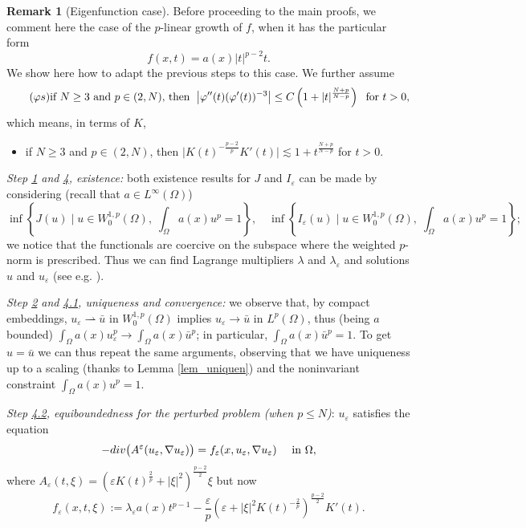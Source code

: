 \documentclass[11pt, reqno]{amsart}
\theoremstyle{definition}
\newtheorem{remark}[lemma]{Remark}
\numberwithin{equation}{section}
\newcommand{\dive}{{\rm div}}
\def\eps{\varepsilon}
\newcommand{\wto}{\rightharpoonup}
\begin{document}
\begin{remark}[Eigenfunction case]
\label{rem_weighted_eigenfunctions}
Before proceeding to the main proofs, we comment here the case of the $p$-linear growth of $f$, when it has the particular form 
$$f(x,t) = a(x) |t|^{p-2} t.$$
We show here how to adapt the previous steps to this case. 
We further assume
\begin{equation}\label{eq_ipot_aggiunt_phi_eigenf}
\tag{$\varphi s$}
\hbox{if $N\geq 3$ and $p \in (2, N)$, then } \; \big|\varphi''(t) (\varphi'(t))^{-3}\big|\leq C\left(1+|t|^{\frac{N+p}{N-p}}\right) \; \hbox{ for $t>0$,}
\end{equation}
which means, in terms of $K$,
\begin{itemize}
\item if $N\geq 3$ and $p \in (2,N)$, then $\big|K(t)^{-\frac{p-2}{p}} K'(t)\big| \lesssim 1+ t^{\frac{N+p}{N-p}}$ for $t > 0$.
\end{itemize}

\smallskip

\emph{Step \hyperlink{Step1}{1} and \hyperlink{Step4}{4}, existence:} 
both existence results for $J$ and $I_{\eps}$ can be made by considering (recall that $a \in L^{\infty}(\Omega)$)
$$\inf\left\{ J(u) \mid u \in W^{1,p}_0(\Omega), \; \int_{\Omega} a(x) u^p = 1 \right\}, \quad \inf\left\{ I_{\eps}(u) \mid u \in W^{1,p}_0(\Omega), \; \int_{\Omega} a(x) u^p = 1 \right\};$$
we notice that the functionals are coercive on the subspace where the weighted $p$-norm is prescribed. 
Thus we can find Lagrange multipliers $\lambda$ and $\lambda_{\eps}$ and solutions $u$ and $u_{\eps}$ (see e.g. \cite[Theorem 6.3.2]{Ber77}). 

\smallskip

\emph{Step \hyperlink{Step2}{2} and \hyperlink{Step4.1}{4.1}, uniqueness and convergence:} 
we observe that, by compact embeddings, $u_{\eps} \wto \bar{u}$ in $W^{1,p}_0(\Omega)$ implies $u_{\eps} \to \bar{u}$ in $L^p(\Omega)$, thus (being $a$ bounded) $\int_{\Omega} a(x) u_{\eps}^p\to \int_{\Omega} a(x) \bar{u}^p$; in particular, $\int_{\Omega} a(x) \bar{u}^p = 1$. 
To get $u=\bar{u}$ we can thus repeat the same arguments, observing that we have uniqueness up to a scaling (thanks to Lemma \ref{lem_uniquen}) and the noninvariant constraint $\int_{\Omega} a(x) u^p = 1 $.

\smallskip

\emph{Step \hyperlink{Step4.2}{4.2}, equiboundedness for the perturbed problem (when $p\leq N$)}: 
$u_{\eps}$ satisfies the equation
$$-\dive\big(A^{\eps}(u_{\eps},\nabla u_{\eps})\big) = f_{\eps}(x,u_{\eps},\nabla u_{\eps}) \quad \hbox{ in $\Omega$},$$
where $A_{\eps}(t,\xi)=(\eps K(t)^{\frac{2}{p}} + |\xi|^2)^{\frac{p-2}{2}} \xi$ but now
$$f_{\eps}(x,t,\xi):= \lambda_{\eps} a(x) t^{p-1} - \frac{\eps}{p} (\eps + |\xi|^2 K(t)^{-\frac{2}{p}})^{\frac{p-2}{2}} K'(t).$$


\end{remark}
\end{document}
